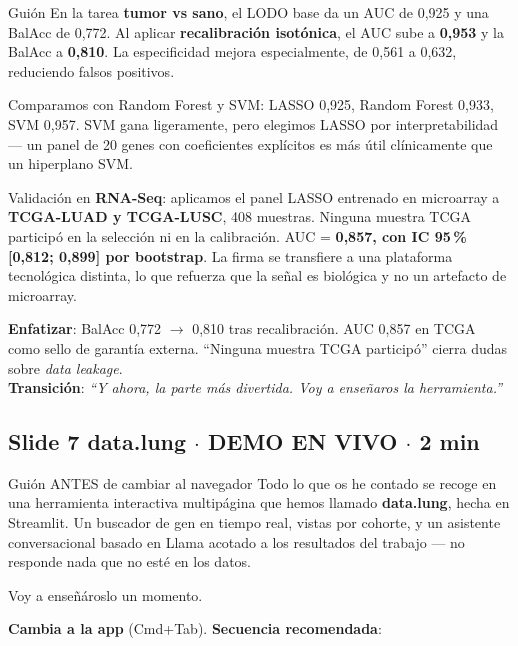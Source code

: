 \documentclass[11pt, a4paper]{article}
\newcommand{\slidebadge}[1]{{\colorbox{verdeTerm}{\color{white}\bfseries\;#1\;}}}
\begin{document}
\begin{guioncaja}{Gui\'on}
En la tarea \textbf{tumor vs sano}, el LODO base da un AUC de 0,925 y una BalAcc de 0,772. Al aplicar \textbf{recalibraci\'on isot\'onica}, el AUC sube a \textbf{0,953} y la BalAcc a \textbf{0,810}. La especificidad mejora especialmente, de 0,561 a 0,632, reduciendo falsos positivos.

Comparamos con Random Forest y SVM: LASSO 0,925, Random Forest 0,933, SVM 0,957. SVM gana ligeramente, pero elegimos LASSO por interpretabilidad --- un panel de 20 genes con coeficientes expl\'icitos es m\'as \'util cl\'inicamente que un hiperplano SVM.

Validaci\'on en \textbf{RNA-Seq}: aplicamos el panel LASSO entrenado en microarray a \textbf{TCGA-LUAD y TCGA-LUSC}, 408 muestras. Ninguna muestra TCGA particip\'o en la selecci\'on ni en la calibraci\'on. AUC = \textbf{0,857, con IC 95\,\% [0,812; 0,899] por bootstrap}. La firma se transfiere a una plataforma tecnol\'ogica distinta, lo que refuerza que la se\~nal es biol\'ogica y no un artefacto de microarray.
\end{guioncaja}

\textbf{Enfatizar}: BalAcc 0,772 $\to$ 0,810 tras recalibraci\'on. AUC 0,857 en TCGA como sello de garant\'ia externa. ``Ninguna muestra TCGA particip\'o'' cierra dudas sobre \emph{data leakage}.\\
\textbf{Transici\'on}: \emph{``Y ahora, la parte m\'as divertida. Voy a ense\~naros la herramienta.''}

\subsection*{\slidebadge{Slide 7} data.lung $\cdot$ DEMO EN VIVO $\cdot$ 2 min}

\begin{guioncaja}{Gui\'on ANTES de cambiar al navegador}
Todo lo que os he contado se recoge en una herramienta interactiva multip\'agina que hemos llamado \textbf{data.lung}, hecha en Streamlit. Un buscador de gen en tiempo real, vistas por cohorte, y un asistente conversacional basado en Llama acotado a los resultados del trabajo --- no responde nada que no est\'e en los datos.

Voy a ense\~n\'aroslo un momento.
\end{guioncaja}

\textbf{Cambia a la app} (Cmd+Tab). \textbf{Secuencia recomendada}:
\end{document}
